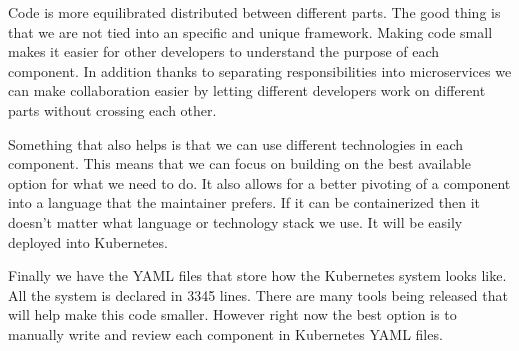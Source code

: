 Code is more equilibrated distributed between different parts. The good thing is that we are not tied into an specific and unique framework. Making code small makes it easier for other developers to understand the purpose of each component. In addition thanks to separating responsibilities into microservices we can make collaboration easier by letting different developers work on different parts without crossing each other.

Something that also helps is that we can use different technologies in each component. This means that we can focus on building on the best available option for what we need to do. It also allows for a better pivoting of a component into a language that the maintainer prefers. If it can be containerized then it doesn’t matter what language or technology stack we use. It will be easily deployed into Kubernetes.

Finally we have the YAML files that store how the Kubernetes system looks like. All the system is declared in 3345 lines. There are many tools being released that will help make this code smaller. However right now the best option is to manually write and review each component in Kubernetes YAML files.



